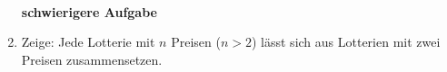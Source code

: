 \begin{enumerate}

~\\{\bf schwierigere Aufgabe}\\

\item Zeige: Jede Lotterie mit $n$ Preisen ($n > 2$) lässt sich aus Lotterien
mit zwei Preisen zusammensetzen.

\end{enumerate}

